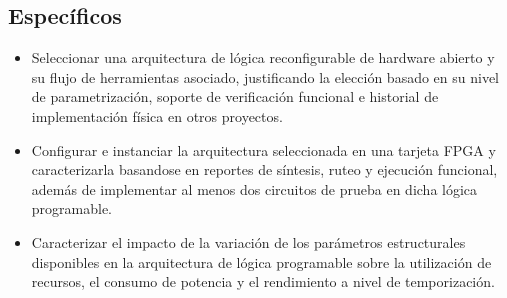 \subsection{Específicos}
	\begin{itemize}
                \item Seleccionar una arquitectura de lógica reconfigurable de hardware 
                abierto y su flujo de herramientas asociado, justificando la elección 
                basado en su nivel de parametrización, soporte de verificación funcional 
                e historial de implementación física en otros proyectos.

                \item Configurar e instanciar la arquitectura seleccionada en una tarjeta 
                FPGA y caracterizarla basandose en reportes de síntesis, ruteo y ejecución 
                funcional, además de implementar al menos dos circuitos de prueba en dicha 
                lógica programable.
                             
                \item Caracterizar el impacto de la variación de los parámetros 
                estructurales disponibles en la arquitectura de lógica programable sobre 
                la utilización de recursos, el consumo de potencia y el rendimiento a nivel 
                de temporización.
    \end{itemize}


